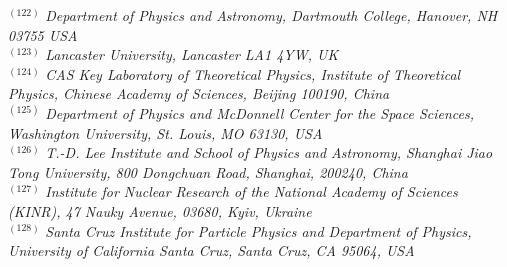 {\begin{center}
$^{(122)}$ \emph{Department of Physics and Astronomy, Dartmouth College, Hanover, NH 03755 USA}\\
$^{(123)}$ \emph{Lancaster University, Lancaster LA1 4YW, UK}\\
$^{(124)}$ \emph{CAS Key Laboratory of Theoretical Physics, Institute of Theoretical Physics, Chinese Academy of Sciences, Beijing 100190, China}\\
$^{(125)}$ \emph{Department of Physics and McDonnell Center for the Space Sciences, Washington University, St. Louis, MO 63130, USA}\\
$^{(126)}$ \emph{T.-D. Lee Institute and School of Physics and Astronomy, Shanghai Jiao Tong University, 800 Dongchuan Road, Shanghai, 200240, China}\\
$^{(127)}$ \emph{Institute for Nuclear Research of the National Academy of Sciences (KINR), 47 Nauky Avenue, 03680, Kyiv, Ukraine}\\
$^{(128)}$ \emph{Santa Cruz Institute for Particle Physics and Department of Physics, University of California Santa Cruz, Santa Cruz, CA 95064, USA}\\

\end{center}}
